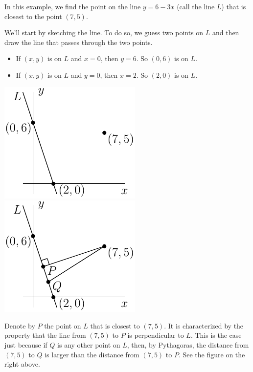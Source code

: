 \begin{eg}\label{eg nearest point}
In this example, we find the point on the line $y=6-3x$ (call the line $L$)
that is closest to the point $(7,5)$. 

We'll start by sketching the line. 
To do so, we guess two points on $L$ and then draw the line that passes 
through the two points.
\begin{itemize}
\item  If $(x,y)$ is on $L$ and $x=0$, then $y=6$. So $(0,6)$ is 
on $L$.
\item If $(x,y)$ is on $L$ and $y=0$, then $x=2$. So $(2,0)$ is 
on $L$.
\end{itemize}

      \begin{efig} 
      \begin{center}
      \includegraphics{closestA.pdf} \qquad\qquad
      \includegraphics{closestB.pdf} 
      \end{center}
      \end{efig} 
Denote by $P$ the point on $L$ that is closest to $(7,5)$. 
It is characterized by the property that the line from $(7,5)$ to $P$
is perpendicular to $L$. This is the case just because if $Q$ is any
other point on $L$, then, by Pythagoras, the distance from $(7,5)$ 
to $Q$ is larger than the distance from $(7,5)$ to $P$. See the figure on the
right above.


\end{eg}
